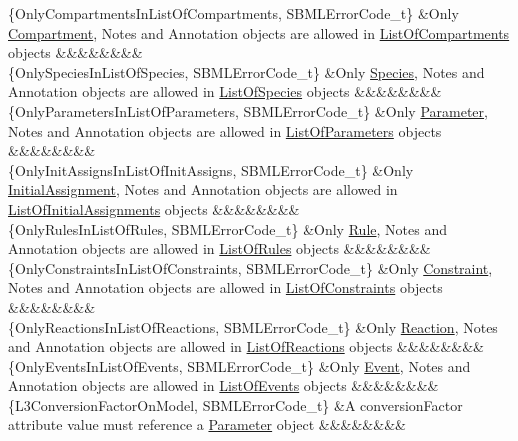 \begin{DoxyParagraph}{}
\begin{longtabu}
\{Only\+Compartments\+In\+List\+Of\+Compartments, S\+B\+M\+L\+Error\+Code\+\_\+t\} &Only \hyperlink{class_compartment}{Compartment}, Notes and Annotation objects are allowed in \hyperlink{class_list_of_compartments}{List\+Of\+Compartments} objects &&&&&&&&\\
\{Only\+Species\+In\+List\+Of\+Species, S\+B\+M\+L\+Error\+Code\+\_\+t\} &Only \hyperlink{class_species}{Species}, Notes and Annotation objects are allowed in \hyperlink{class_list_of_species}{List\+Of\+Species} objects &&&&&&&&\\
\{Only\+Parameters\+In\+List\+Of\+Parameters, S\+B\+M\+L\+Error\+Code\+\_\+t\} &Only \hyperlink{class_parameter}{Parameter}, Notes and Annotation objects are allowed in \hyperlink{class_list_of_parameters}{List\+Of\+Parameters} objects &&&&&&&&\\
\{Only\+Init\+Assigns\+In\+List\+Of\+Init\+Assigns, S\+B\+M\+L\+Error\+Code\+\_\+t\} &Only \hyperlink{class_initial_assignment}{Initial\+Assignment}, Notes and Annotation objects are allowed in \hyperlink{class_list_of_initial_assignments}{List\+Of\+Initial\+Assignments} objects &&&&&&&&\\
\{Only\+Rules\+In\+List\+Of\+Rules, S\+B\+M\+L\+Error\+Code\+\_\+t\} &Only \hyperlink{class_rule}{Rule}, Notes and Annotation objects are allowed in \hyperlink{class_list_of_rules}{List\+Of\+Rules} objects &&&&&&&&\\
\{Only\+Constraints\+In\+List\+Of\+Constraints, S\+B\+M\+L\+Error\+Code\+\_\+t\} &Only \hyperlink{class_constraint}{Constraint}, Notes and Annotation objects are allowed in \hyperlink{class_list_of_constraints}{List\+Of\+Constraints} objects &&&&&&&&\\
\{Only\+Reactions\+In\+List\+Of\+Reactions, S\+B\+M\+L\+Error\+Code\+\_\+t\} &Only \hyperlink{class_reaction}{Reaction}, Notes and Annotation objects are allowed in \hyperlink{class_list_of_reactions}{List\+Of\+Reactions} objects &&&&&&&&\\
\{Only\+Events\+In\+List\+Of\+Events, S\+B\+M\+L\+Error\+Code\+\_\+t\} &Only \hyperlink{class_event}{Event}, Notes and Annotation objects are allowed in \hyperlink{class_list_of_events}{List\+Of\+Events} objects &&&&&&&&\\
\{L3\+Conversion\+Factor\+On\+Model, S\+B\+M\+L\+Error\+Code\+\_\+t\} &A \textquotesingle{}conversion\+Factor\textquotesingle{} attribute value must reference a \hyperlink{class_parameter}{Parameter} object &&&&&&&&\\

\end{longtabu}
\end{DoxyParagraph}
